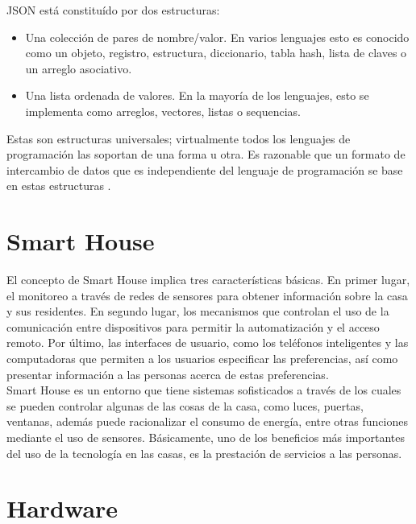 JSON está constituído por dos estructuras:

\begin{itemize}
	\item Una colección de pares de nombre/valor. En varios lenguajes esto es conocido como un objeto, registro, estructura, diccionario, tabla hash, lista de claves o un arreglo asociativo.
	
	\item Una lista ordenada de valores. En la mayoría de los lenguajes, esto se implementa como arreglos, vectores, listas o sequencias.
\end{itemize}

Estas son estructuras universales; virtualmente todos los lenguajes de programación las soportan de una forma u otra. Es razonable que un formato de intercambio de datos que es independiente del lenguaje de programación se base en estas estructuras \cite{JSON}.\\

\section{Smart House}

El concepto de Smart House implica tres características básicas. En primer lugar, el monitoreo a través de redes de sensores para obtener información sobre la casa y sus residentes. En segundo lugar, los mecanismos que controlan el uso de la comunicación entre dispositivos para permitir la automatización y el acceso remoto. Por último, las interfaces de usuario, como los teléfonos inteligentes y las computadoras que permiten a los usuarios especificar las preferencias, así como presentar información a las personas acerca de estas preferencias. \\

Smart House es un entorno que tiene sistemas sofisticados a través de los cuales se pueden controlar algunas de las cosas de la casa, como luces, puertas, ventanas, además  puede racionalizar el consumo de energía, entre otras funciones mediante el uso de sensores. Básicamente, uno de los beneficios más importantes del uso de la tecnología en las casas, es la prestación de servicios a las personas.\cite{Howedi2016} \\

\section{Hardware}

